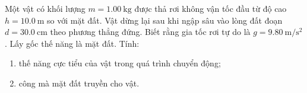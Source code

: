 \begin{ex}
Một vật có khối lượng $m=\SI{1.00}{\kilogram}$ được thả rơi không vận tốc đầu từ độ cao $h=\SI{10.0}{\meter}$ so với mặt đất. Vật dừng lại sau khi ngập sâu vào lòng đất đoạn $d=\SI{30.0}{\centi\meter}$ theo phương thẳng đứng. Biết rằng gia tốc rơi tự do là $g=\SI{9.80}{\meter/\second^2}$. Lấy gốc thế năng là mặt đất. Tính:
\begin{enumerate}[label=\alph*)]
	\item thế năng cực tiểu của vật trong quá trình chuyển động;
	\item công mà mặt đất truyền cho vật.
\end{enumerate}	
\end{ex}
